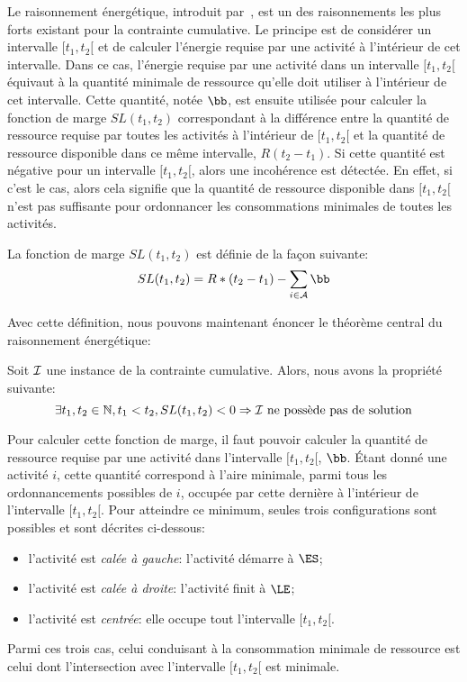 Le raisonnement énergétique, introduit par~\cite{RELopez}, est un des
raisonnements les plus forts existant pour la contrainte
cumulative. Le principe est de considérer un intervalle $[t_1,t_2[$ et
de calculer l'énergie requise par une activité à l'intérieur de cet
intervalle. Dans ce cas, l'énergie requise par une activité dans un
intervalle $[t_1,t_2[$  équivaut à
la quantité minimale de ressource qu'elle doit utiliser
à l'intérieur de cet intervalle. Cette quantité, notée $\bb$, est
ensuite utilisée pour calculer la fonction de marge $SL(t_1,t_2)$
correspondant à la différence entre la quantité de ressource requise
par toutes les activités à l'intérieur de $[t_1,t_2[$ et la quantité
de ressource disponible dans ce même intervalle, $R (t_2-t_1)$. Si
cette quantité est négative pour un intervalle $[t_1,t_2[$, alors une
incohérence est détectée. En effet, si c'est le cas, alors cela
signifie que la quantité de ressource disponible dans $[t_1,t_2[$
n'est pas suffisante pour ordonnancer les consommations minimales de
toutes les activités.

\begin{defi}
La fonction de marge $SL(t_1,t_2)$ est définie de la façon suivante: 
\[  SL(t_1,t_2) = R*(t_2-t_1) - \sum_{i \in \A} \bb \]
\end{defi}

Avec cette définition, nous pouvons maintenant énoncer le théorème
central du raisonnement énergétique:
 
\begin{theo}
\label{th:centerRE}
Soit ${\cal I}$ une instance de la contrainte cumulative. Alors, nous avons
la propriété suivante:
\begin{equation}
\exists t_1,t_2 \in \mathbb{N}, t_1 < t_2, SL(t_1,t_2) <0 \Rightarrow {\cal I}
\text{ ne possède pas de solution}
\label{eq:centerRE}
\end{equation}
\end{theo}

Pour calculer cette fonction de marge, il faut pouvoir calculer la
quantité de ressource requise par une activité dans l'intervalle
$[t_1,t_2[$, $\bb$. {\'E}tant donné une activité $i$, cette quantité
correspond à l'aire minimale, parmi tous les ordonnancements possibles
de $i$, occupée par cette dernière à l'intérieur de l'intervalle
$[t_1,t_2[$. Pour atteindre ce minimum, seules trois configurations
sont possibles et sont décrites ci-dessous:
\begin{itemize}
\item l'activité est {\it calée à gauche}: l'activité démarre à $\ES$; 
\item l'activité est {\it  calée à droite}: l'activité finit à $\LE$;
\item l'activité est {\it centrée}: elle occupe tout l'intervalle
  $[t_1,t_2[$.
\end{itemize}
Parmi ces trois cas, celui conduisant à la consommation minimale de
ressource est celui dont l'intersection avec l'intervalle $[t_1,t_2[$
est minimale.

